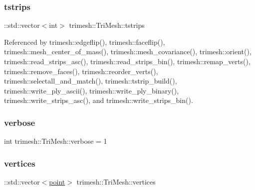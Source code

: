 \mbox{\label{classtrimesh_1_1TriMesh_aec553d87d4887e42edfaa70d686371aa}} 
\subsubsection{\texorpdfstring{tstrips}{tstrips}}
{\footnotesize\ttfamily \+::std\+::vector$<$int$>$ trimesh\+::\+Tri\+Mesh\+::tstrips}



Referenced by trimesh\+::edgeflip(), trimesh\+::faceflip(), trimesh\+::mesh\+\_\+center\+\_\+of\+\_\+mass(), trimesh\+::mesh\+\_\+covariance(), trimesh\+::orient(), trimesh\+::read\+\_\+strips\+\_\+asc(), trimesh\+::read\+\_\+strips\+\_\+bin(), trimesh\+::remap\+\_\+verts(), trimesh\+::remove\+\_\+faces(), trimesh\+::reorder\+\_\+verts(), trimesh\+::selectall\+\_\+and\+\_\+match(), trimesh\+::tstrip\+\_\+build(), trimesh\+::write\+\_\+ply\+\_\+ascii(), trimesh\+::write\+\_\+ply\+\_\+binary(), trimesh\+::write\+\_\+strips\+\_\+asc(), and trimesh\+::write\+\_\+strips\+\_\+bin().

\mbox{\label{classtrimesh_1_1TriMesh_ae3a58949e68e935230335e03586151b4}} 
\subsubsection{\texorpdfstring{verbose}{verbose}}
{\footnotesize\ttfamily int trimesh\+::\+Tri\+Mesh\+::verbose = 1\hspace{0.3cm}{\ttfamily [static]}}

\mbox{\label{classtrimesh_1_1TriMesh_ac7a4e1c3bf3e16ecf51316d3b9327249}} 
\subsubsection{\texorpdfstring{vertices}{vertices}}
{\footnotesize\ttfamily \+::std\+::vector$<$\hyperlink{namespacetrimesh_a325b99fd6454b22fa4c4bc3223271b2c}{point}$>$ trimesh\+::\+Tri\+Mesh\+::vertices}



